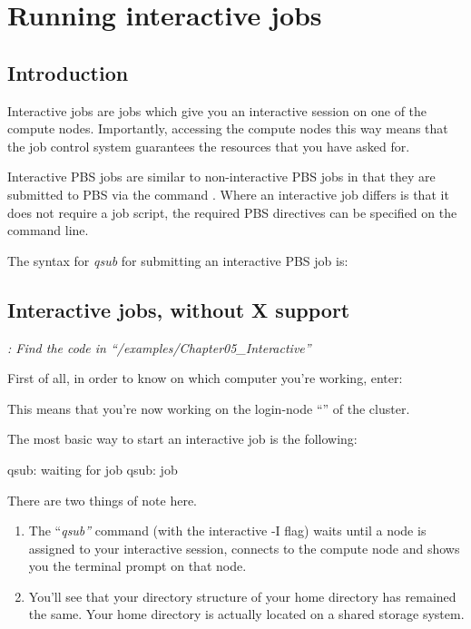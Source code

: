 \chapter{Running interactive jobs}

\section{Introduction}

Interactive jobs are jobs which give you an interactive session on one of the
compute nodes. Importantly, accessing the compute nodes this way means that the
job control system guarantees the resources that you have asked for.

Interactive PBS jobs are similar to non-interactive PBS jobs in that they are
submitted to PBS via the command . Where an interactive job
differs is that it does not require a job script, the required PBS directives
can be specified on the command line.

The syntax for \emph{qsub} for submitting an interactive PBS job is:
\begin{prompt}
\end{prompt}

\section{Interactive jobs, without X support}

\emph{: Find the code in
``\tilde/examples/Chapter05\_Interactive''}

First of all, in order to know on which computer you're working, enter:
\begin{prompt}
\end{prompt}

This means that you're now working on the login-node ``\emph{\loginnode}'' of
the \hpc cluster.

The most basic way to start an interactive job is the following:
\begin{prompt}
qsub: waiting for job %
qsub: job %
\end{prompt}

There are two things of note here.

\begin{enumerate}
  \item  The ``\emph{qsub''} command (with the interactive -I
      flag) waits until a node is assigned to your interactive session,
      connects to the compute node and shows you the terminal prompt on that
      node.
  \item  You'll see that your directory structure of your home directory has
      remained the same. Your home directory is actually located on a shared
      storage system.
\end{enumerate}

